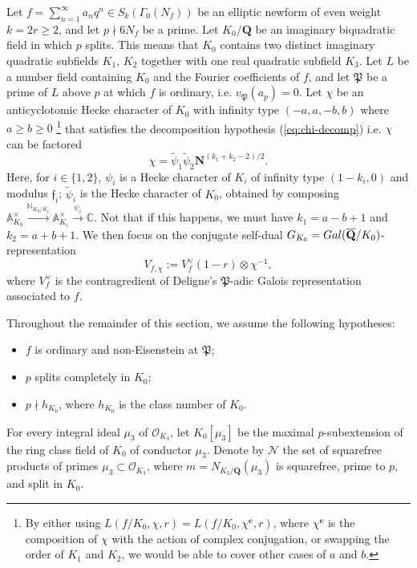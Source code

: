 \documentclass[10pt,letterpaper]{amsart}
\theoremstyle{plain}
\theoremstyle{definition}
\theoremstyle{definition}
\theoremstyle{plain}
\theoremstyle{plain}
\theoremstyle{plain}
\theoremstyle{remark}
\numberwithin{equation}{section}
\newcommand{\cc}{\mathbf{c}}
\newcommand{\fkf}{\mathfrak{f}}
\def\cO{\mathcal O}
\newcommand{\Q}{\mathbf{Q}}
\begin{document}
{
\renewcommand{\thethm}{\Alph{thm}}


Let $f=\sum_{n=1}^\infty a_nq^n\in S_{k}(\Gamma_0(N_f))$ be an elliptic newform of even weight $k=2r\geq 2$,  and let $p\nmid 6N_f$ be a prime. Let $K_0/\Q$ be an imaginary biquadratic field in which $p$ splits. This means that $K_0$ contains two distinct imaginary quadratic subfields $K_1$, $K_2$ together with one real quadratic subfield $K_3$.  Let $L$ be a number field containing $K_0$ and the Fourier coefficients of $f$, and let $\mathfrak{P}$ be a prime of $L$ above $p$ at which $f$ is ordinary, i.e. $v_{\mathfrak{P}}(a_p)=0$. Let $\chi$ be an anticyclotomic Hecke character of $K_0$ with infinity type $(-a,a,-b,b)$ where $a\ge b\ge 0$ \footnote{By either using $L(f/K_0,\chi,r)=L(f/K_0,\chi^\cc,r)$, where $\chi^\cc$ is the composition of $\chi$ with the action of complex conjugation, or swapping the order of $K_1$ and $K_2$, we would be able to cover other cases of $a$ and $b$.} that satisfies the decomposition hypothesis (\ref{eq:chi-decomp}) i.e. $\chi$ can be factored
 \begin{equation*}
\chi=\tilde{\psi}_1\tilde{\psi}_2\mathbf{N}^{(k_1+k_2-2)/2}.
    \end{equation*}
Here, for $i\in\{1,2\}$, $\psi_i$ is a Hecke character of $K_i$ of infinity type $(1-k_i,0)$ and modulus  $\fkf_i$; $\tilde{\psi}_i$ is the Hecke character of $K_0$, obtained by composing $\mathbb{A}_{K_0}^{\times}\xrightarrow{\mathbb{N}_{K_0/K_i}}\mathbb{A}_{K_i}^{\times}\xrightarrow{\psi_i}\mathbb{C}$. Not that if this happens, we must have $k_1=a-b+1$ and $k_2=a+b+1$. We then focus on the conjugate self-dual $G_{K_0}={\rm Gal}(\overline{\Q}/K_0)$-representation
\[
V_{f,\chi}:=V_f^\vee(1-r)\otimes\chi^{-1},
\] 
where $V_f^\vee$ is the contragredient of Deligne's $\mathfrak{P}$-adic Galois representation associated to $f$. 



Throughout the remainder of this section, 
we assume the following hypotheses:
\begin{itemize}
    \item $f$ is ordinary and non-Eisenstein at $\mathfrak{P}$;
    \item $p$ splits completely in $K_0$;
    \item $p\nmid h_{K_0}$, where $h_{K_0}$ is the class number of $K_0$.
\end{itemize}
For every integral ideal $\mu_3$ of $\cO_{K_3}$, let $K_0[\mu_3]$ be the maximal $p$-subextension of the ring class field of $K_0$ of conductor $\mu_3$. Denote by $\mathcal{N}$ the set of squarefree products of primes $\mu_3\subset\cO_{K_3}$, where $m=N_{K_3/\Q}(\mu_3)$ is squarefree, prime to $p$, and split in $K_0$. 



}
\end{document}
